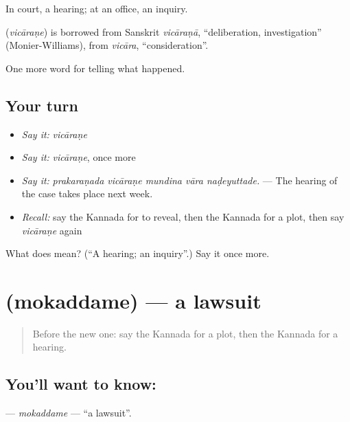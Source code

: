 In court, a hearing; at an office, an inquiry.

\begin{cousinweb}
\textbf{} (\emph{vicāraṇe}) is borrowed from Sanskrit \emph{vicāraṇā}, \textquotedblleft{}deliberation, investigation\textquotedblright{} (Monier-Williams), from \emph{vicāra}, \textquotedblleft{}consideration\textquotedblright{}.
\end{cousinweb}

\begin{grammarlens}[title={What you've built}]
One more word for telling what happened.
\end{grammarlens}

\subsection*{Your turn}
\begin{itemize}
\raggedright
  \item \emph{Say it:} \emph{vicāraṇe}
  \item \emph{Say it:} \emph{vicāraṇe}, once more
  \item \emph{Say it:} \emph{prakaraṇada vicāraṇe mundina vāra naḍeyuttade.} — The hearing of the case takes place next week.
  \item \emph{Recall:} say the Kannada for to reveal, then the Kannada for a plot, then say \emph{vicāraṇe} again
\end{itemize}

\begin{tcolorbox}[breakable,colback=teal!4,colframe=teal!35!black,title={Before you move on}]
What does  mean? (\textquotedblleft{}A hearing; an inquiry\textquotedblright{}.) Say it once more.
\end{tcolorbox}
\section[\texorpdfstring{\kn{ಮೊಕದ್ದಮೆ} (mokaddame)}{ಮೊಕದ್ದಮೆ (mokaddame)}]{ (mokaddame) — a lawsuit}

\label{lesson:KA-C358-mokaddame}



\begin{quote}
Before the new one: say the Kannada for a plot, then the Kannada for a hearing.
\end{quote}

\subsection*{You'll want to know: }
\textbf{} — \emph{mokaddame} — \textquotedblleft{}a lawsuit\textquotedblright{}.

